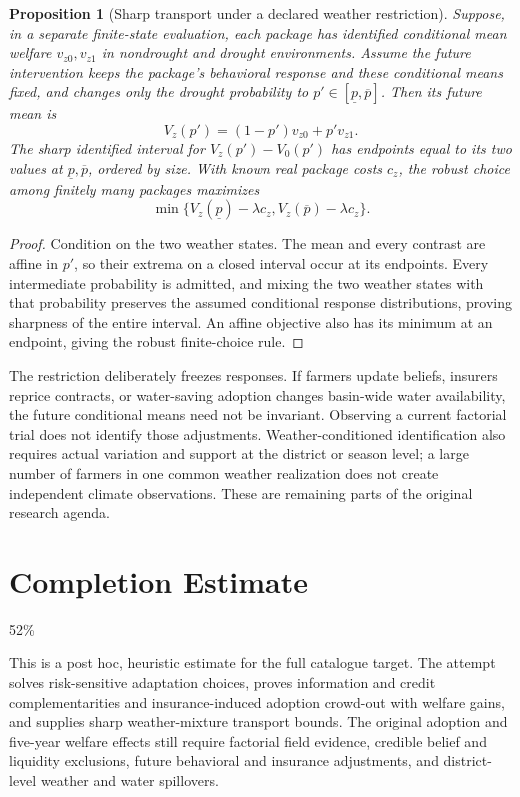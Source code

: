 \documentclass[11pt,a4paper]{article}
\newtheorem{proposition}[theorem]{Proposition}
\theoremstyle{remark}
\begin{document}
\begin{proposition}[Sharp transport under a declared weather restriction]
Suppose, in a separate finite-state evaluation, each package has identified conditional mean welfare $v_{z0},v_{z1}$ in nondrought and drought environments. Assume the future intervention keeps the package's behavioral response and these conditional means fixed, and changes only the drought probability to $p'\in[\underline p,\overline p]$. Then its future mean is
\[
 V_z(p')=(1-p')v_{z0}+p'v_{z1}.
\]
The sharp identified interval for $V_z(p')-V_0(p')$ has endpoints equal to its two values at $\underline p,\overline p$, ordered by size. With known real package costs $c_z$, the robust choice among finitely many packages maximizes
\[
 \min\{V_z(\underline p)-\lambda c_z,
          V_z(\overline p)-\lambda c_z\}.
\]
\end{proposition}
\begin{proof}
Condition on the two weather states. The mean and every contrast are affine in $p'$, so their extrema on a closed interval occur at its endpoints. Every intermediate probability is admitted, and mixing the two weather states with that probability preserves the assumed conditional response distributions, proving sharpness of the entire interval. An affine objective also has its minimum at an endpoint, giving the robust finite-choice rule.
\end{proof}
The restriction deliberately freezes responses. If farmers update beliefs, insurers reprice contracts, or water-saving adoption changes basin-wide water availability, the future conditional means need not be invariant. Observing a current factorial trial does not identify those adjustments. Weather-conditioned identification also requires actual variation and support at the district or season level; a large number of farmers in one common weather realization does not create independent climate observations. These are remaining parts of the original research agenda.

\section{Completion Estimate}
52\%

This is a post hoc, heuristic estimate for the full catalogue target.
The attempt solves risk-sensitive adaptation choices, proves information and credit complementarities and insurance-induced adoption crowd-out with welfare gains, and supplies sharp weather-mixture transport bounds. The original adoption and five-year welfare effects still require factorial field evidence, credible belief and liquidity exclusions, future behavioral and insurance adjustments, and district-level weather and water spillovers.
\end{document}
